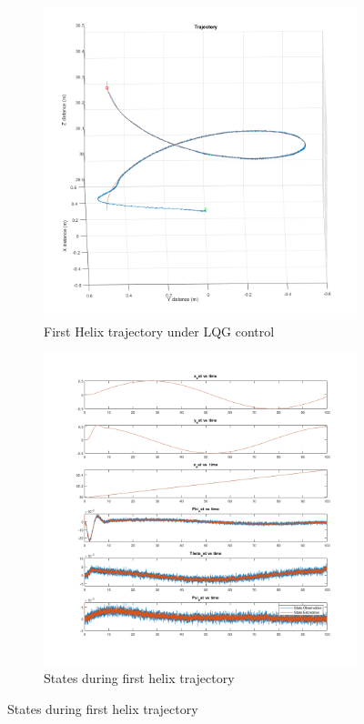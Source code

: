 \documentclass[conf]{new-aiaa}
\begin{document}
\begin{doublespace}
\begin{singlespace}
\begin{figure}[!htpb]
\begin{subfigure}{.4\textwidth}
  \centering
  \includegraphics[scale= 0.3]{LQGhelix_1.png}
  \caption{First Helix trajectory under LQG control}
  \label{LQGhelix}
\end{subfigure}%
\begin{subfigure}{.4\textwidth}
  \centering
  \includegraphics[scale= 0.4]{LQGhelix_1_state.png}
  \caption{States during first helix trajectory}
  \label{LQGhelix_1_state}
\end{subfigure}%
\end{figure}


\end{singlespace}
\end{doublespace}
\end{document}
